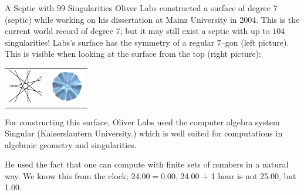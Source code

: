 \begin{surferPage}{A Septic with 99 Singularities}
    Oliver Labs constructed a surface of degree $7$ (septic) while working on his
    dissertation at Mainz University in 2004. This is the current world record
    of degree $7$; but it may still exist a septic with up to $104$
    singularities!  
    Labs's surface has the symmetry of a regular $7$--gon (left picture).
    This is visible when looking at the surface from the top (right picture):

    \vspace*{-0.3em}
    \begin{center}
      \begin{tabular}{c@{\qquad}c}
        \includegraphics[height=1.5cm]{./../../common/images/labsseptic1.pdf}
        &
        \includegraphics[height=1.5cm]{./../../common/images/labs_septic_von_oben}
      \end{tabular}
    \end{center}
    \vspace*{-0.3em}

    For constructing this surface, Oliver Labs used the computer algebra system
    {\sc Singular} (Kaiserslautern University.) which is well suited for
    computations in algebraic geometry and singularities.

    He used the fact that one can compute with finite sets of numbers in a
    natural way. We know this from the clock; 24.00$=$0.00, 24.00 $+$ 1 hour is
    not 25.00, but 1.00.
\end{surferPage}

